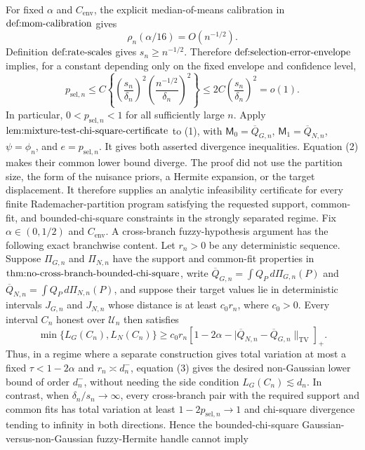 For fixed \(\alpha\) and \(C_{\mathrm{env}}\), the explicit median-of-means calibration in \(\textup{def:mom-calibration}\) gives
\[
 \rho_n(\alpha/16)=O(n^{-1/2}).
\]
Definition \(\textup{def:rate-scales}\) gives \(s_n\ge n^{-1/2}\).  Therefore \(\textup{def:selection-error-envelope}\) implies, for a constant depending only on the fixed envelope and confidence level,
\[
 p_{\mathrm{sel},n}
 \le C\left\{
 \left(\frac{s_n}{\delta_n}\right)^2
 \left(\frac{n^{-1/2}}{\delta_n}\right)^2
 \right\}
 \le 2C\left(\frac{s_n}{\delta_n}\right)^2
 =o(1).
\tag{2}
\]
In particular, \(0<p_{\mathrm{sel},n}<1\) for all sufficiently large \(n\).  Apply \(\textup{lem:mixture-test-chi-square-certificate}\) to (1), with \(\mathsf M_0=\overline Q_{G,n}\), \(\mathsf M_1=\overline Q_{N,n}\), \(\psi=\phi_n\), and \(e=p_{\mathrm{sel},n}\).  It gives both asserted divergence inequalities.  Equation (2) makes their common lower bound diverge.  The proof did not use the partition size, the form of the nuisance priors, a Hermite expansion, or the target displacement.  It therefore supplies an analytic infeasibility certificate for every finite Rademacher-partition program satisfying the requested support, common-fit, and bounded-chi-square constraints in the strongly separated regime.
Fix \(\alpha\in(0,1/2)\) and \(C_{\mathrm{env}}\).  A cross-branch fuzzy-hypothesis argument has the following exact branchwise content.  Let \(r_n>0\) be any deterministic sequence.  Suppose \(\Pi_{G,n}\) and \(\Pi_{N,n}\) have the support and common-fit properties in \(\textup{thm:no-cross-branch-bounded-chi-square}\), write \(\overline Q_{G,n}=\int Q_P\,d\Pi_{G,n}(P)\) and \(\overline Q_{N,n}=\int Q_P\,d\Pi_{N,n}(P)\), and suppose their target values lie in deterministic intervals \(J_{G,n}\) and \(J_{N,n}\) whose distance is at least \(c_0r_n\), where \(c_0>0\).  Every interval \(C_n\) honest over \(\mathcal U_n\) then satisfies
\[
 \min\{L_G(C_n),L_N(C_n)\}
 \ge c_0r_n
 \left[1-2\alpha-|\overline Q_{N,n}-\overline Q_{G,n}\|_{\mathrm{TV}}\right]_+.
\tag{3}
\]
Thus, in a regime where a separate construction gives total variation at most a fixed \(\tau<1-2\alpha\) and \(r_n\asymp d_n^-\), equation (3) gives the desired non-Gaussian lower bound of order \(d_n^-\), without needing the side condition \(L_G(C_n)\lesssim d_n\).  In contrast, when \(\delta_n/s_n\to\infty\), every cross-branch pair with the required support and common fits has total variation at least \(1-2p_{\mathrm{sel},n}\to1\) and chi-square divergence tending to infinity in both directions.  Hence the bounded-chi-square Gaussian-versus-non-Gaussian fuzzy-Hermite handle cannot imply
